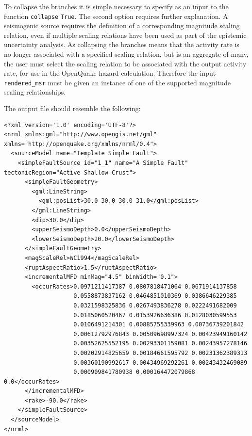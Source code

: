 To collapse the branches it is simple necessary to specify as an input to the function \verb=collapse= \verb=True=. The second option requires further explanation. A seismogenic source requires the definition of a corresponding magnitude scaling relation, even if multiple scaling relations have been used as part of the epistemic uncertainty analysis. As collapsing the branches means that the activity rate is no longer associated with a specified scaling relation, but is an aggregate of many, the user must select the scaling relation to be associated with the output activity rate, for use in the OpenQuake hazard calculation. Therefore the input \verb=rendered_msr= must be given an instance of one of the supported magnitude scaling relationships.

The output file should resemble the following:

\begin{Verbatim}[frame=single, commandchars=\\\{\}, fontsize=\scriptsize]
<?xml version='1.0' encoding='UTF-8'?>
<nrml xmlns:gml="http://www.opengis.net/gml" xmlns="http://openquake.org/xmlns/nrml/0.4">
  <sourceModel name="Template Simple Fault">
    <simpleFaultSource id="1_1" name="A Simple Fault" tectonicRegion="Active Shallow Crust">
      <simpleFaultGeometry>
        <gml:LineString>
          <gml:posList>30.0 30.0 30.0 31.0</gml:posList>
        </gml:LineString>
        <dip>30.0</dip>
        <upperSeismoDepth>0.0</upperSeismoDepth>
        <lowerSeismoDepth>20.0</lowerSeismoDepth>
      </simpleFaultGeometry>
      <magScaleRel>WC1994</magScaleRel>
      <ruptAspectRatio>1.5</ruptAspectRatio>
      <incrementalMFD minMag="4.5" binWidth="0.1">
        <occurRates>0.0971211417387 0.0807818471064 0.0671914137858
                    0.0558873837162 0.0464851010369 0.0386646229385
                    0.0321598325836 0.0267493836278 0.0222491682009
                    0.0185060520467 0.0153926636386 0.0128030599553
                    0.0106491214301 0.00885755339963 0.00736739201842
                    0.00612792976843 0.00509698997324 0.00423949160142 
                    0.00352625552195 0.00293301159081 0.00243957278146
                    0.00202914825659 0.00184661595792 0.00231362389313
                    0.00360190992617 0.00434969292261 0.00243432469089
                    0.000909841780938 0.000164472079868 0.0</occurRates>
      </incrementalMFD>
      <rake>-90.0</rake>
    </simpleFaultSource>
  </sourceModel>
</nrml>
\end{Verbatim}

